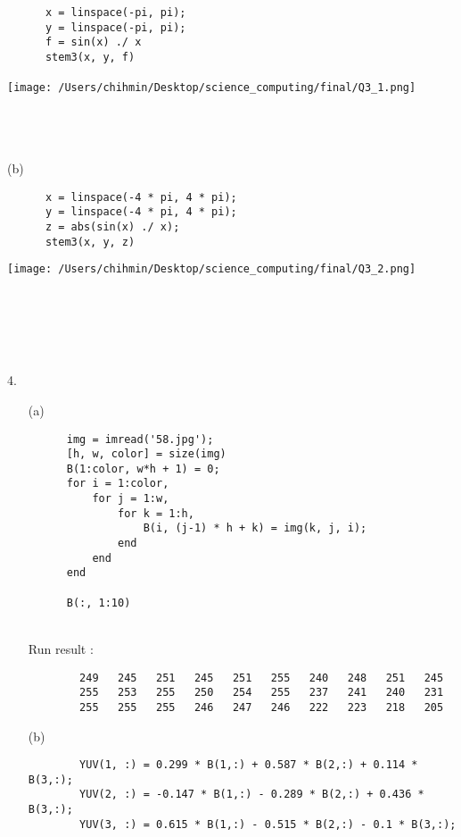 \documentclass{article}
\begin{document}
\begin{enumerate*}
\begin{enumerate*}
      \begin{lstlisting}
      x = linspace(-pi, pi);
      y = linspace(-pi, pi);
      f = sin(x) ./ x
      stem3(x, y, f)
      \end{lstlisting}
      
      \texttt{[image: /Users/chihmin/Desktop/science\_computing/final/Q3\_1.png]}
      \ \\ 
      \ \\  
      \ \\ 
      \ \\  
    
      \item [(b)] \text{} \\
      \begin{lstlisting}
      x = linspace(-4 * pi, 4 * pi);
      y = linspace(-4 * pi, 4 * pi);
      z = abs(sin(x) ./ x);
      stem3(x, y, z)
      \end{lstlisting}
      \texttt{[image: /Users/chihmin/Desktop/science\_computing/final/Q3\_2.png]}
    \end{enumerate*}
    
      \ \\ 
      \ \\  
      \ \\ 
      \ \\  
    \item [4.]
    \begin{enumerate}
      \item [(a)]
      \begin{lstlisting}
	  img = imread('58.jpg');
	  [h, w, color] = size(img)
	  B(1:color, w*h + 1) = 0;
	  for i = 1:color,
		  for j = 1:w,
			  for k = 1:h,
				  B(i, (j-1) * h + k) = img(k, j, i);
			  end
		  end
	  end

	  B(:, 1:10)  
      \end{lstlisting} \ \\ 
      Run result :
      \begin{lstlisting}
        249   245   251   245   251   255   240   248   251   245
        255   253   255   250   254   255   237   241   240   231
        255   255   255   246   247   246   222   223   218   205
      \end{lstlisting}
      
      \item [(b)]
      \begin{lstlisting}
		YUV(1, :) = 0.299 * B(1,:) + 0.587 * B(2,:) + 0.114 * B(3,:);
		YUV(2, :) = -0.147 * B(1,:) - 0.289 * B(2,:) + 0.436 * B(3,:);
		YUV(3, :) = 0.615 * B(1,:) - 0.515 * B(2,:) - 0.1 * B(3,:);


\end{lstlisting}
\end{enumerate}
\end{enumerate*}
\end{document}
